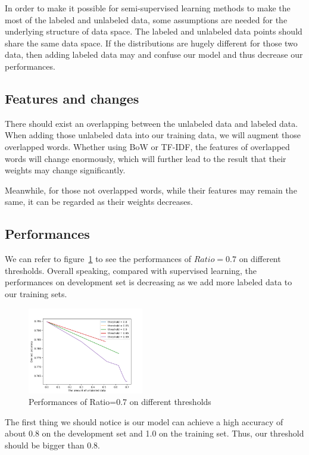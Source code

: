 In order to make it possible for semi-supervised learning methods to make the most of the labeled and unlabeled data, some assumptions are needed for the underlying structure of data space. The labeled and unlabeled data points should share the same data space. If the distributions are hugely different for those two data, then adding labeled data may and confuse our model and thus decrease our performances.

\subsection{\textbf{Features and changes}}

There should exist an overlapping between the unlabeled data and labeled data. When adding those unlabeled data into our training data, we will augment those overlapped words. Whether using BoW or TF-IDF, the features of overlapped words will change enormously, which will further lead to the result that their weights may change significantly. 

Meanwhile, for those not overlapped words, while their features may remain the same, it can be regarded as their weights decreases.

\subsection{\textbf{Performances}}

We can refer to figure~\ref{fig:threshold} to see the performances of $Ratio=0.7$ on different thresholds. Overall speaking, compared with supervised learning, the performances on development set is decreasing as we add more labeled data to our training sets. 

\begin{figure}[!ht]
    \centering
    \includegraphics[width=0.45\textwidth]{files/figs/semi.png}
    \caption[]%
    {{\small Performances of Ratio=0.7 on different thresholds}}
    \label{fig:threshold}
\end{figure}

The first thing we should notice is our model can achieve a high accuracy of about 0.8 on the development set and  1.0 on the training set. Thus, our threshold should be bigger than 0.8.

